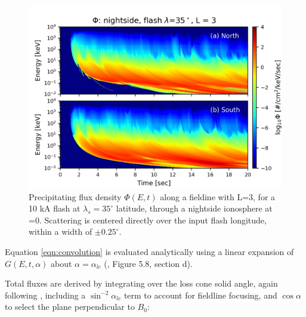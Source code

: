 \begin{figure}[ht]
\begin{center}
\includegraphics{figures/phi_E-t_spectra.png}
\caption[Precipitating flux density E-t spectra for $\lambda_s=35^\circ$ and L=3]{Precipitating flux density $\Phi(E,t)$ along a fieldine with L=3, for a 10 kA flash at $\lambda_s=35^\circ$ latitude, through a nightside ionosphere at \kp{}=0. Scattering is centered directly over the input flash longitude, within a width of $\pm0.25^\circ.$}
\label{fig:phi_E-t_spectra}
\end{center}
\end{figure}

Equation \eqref{eqn:convolution} is evaluated analytically using a linear expansion of $G(E,t,\alpha)$ about $\alpha = \alpha_{lc}$ (\cite{Bortnik2005}, Figure 5.8, section d).

%
%
Total fluxes are derived by integrating over the loss cone solid angle, again following \cite{Bortnik2005}, including a $\sin^{-2}\alpha_{lc}$ term to account for fieldline focusing, and $\cos\alpha$ to select the plane perpendicular to $B_0$:


